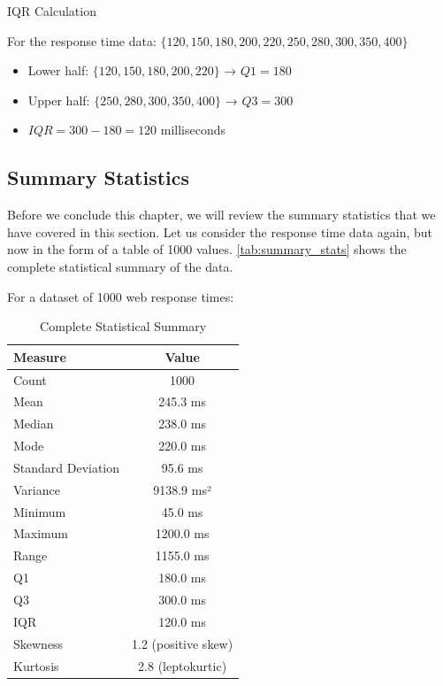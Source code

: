 \begin{example} IQR Calculation

For the response time data: $\{120, 150, 180, 200, 220, 250, 280, 300, 350, 400\}$

\begin{itemize}
    \item Lower half: $\{120, 150, 180, 200, 220\}$ → $Q1 = 180$
    \item Upper half: $\{250, 280, 300, 350, 400\}$ → $Q3 = 300$
    \item $IQR = 300 - 180 = 120$ milliseconds
\end{itemize}
\end{example}



\subsection*{Summary Statistics}

Before we conclude this chapter, we will review the summary statistics that we have covered in this section. Let us consider the response time data again, but now in the form of a table of 1000 values. \autoref{tab:summary_stats} shows the complete statistical summary of the data.

\begin{example}
For a dataset of 1000 web response times:

\begin{table}[h]
\centering
\renewcommand{\arraystretch}{1.3}
\begin{tabular}{|l|c|}
\hline
\textbf{Measure} & \textbf{Value} \\
\hline
Count & 1000 \\
Mean & 245.3 ms \\
Median & 238.0 ms \\
Mode & 220.0 ms \\
Standard Deviation & 95.6 ms \\
Variance & 9138.9 ms² \\
Minimum & 45.0 ms \\
Maximum & 1200.0 ms \\
Range & 1155.0 ms \\
Q1 & 180.0 ms \\
Q3 & 300.0 ms \\
IQR & 120.0 ms \\
Skewness & 1.2 (positive skew) \\
Kurtosis & 2.8 (leptokurtic) \\
\hline
\end{tabular}
\caption{Complete Statistical Summary}
\label{tab:summary_stats}
\end{table}
\end{example}

